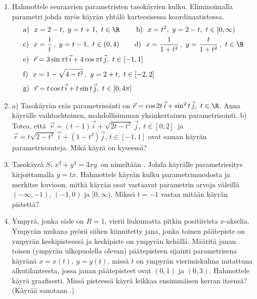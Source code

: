 \Harj
\begin{enumerate}

\item
Hahmottele seuraavien parametristen tasokäyrien kulku. Eliminoimalla parametri johda myös
käyrän yhtälö karteesisessa koordinaatistossa.
\begin{align*}
&\text{a)}\ \ x=2-t,\ y=t+1,\ t\in\R \qquad\ \text{b)}\ \ x=t^2,\ y=2-t,\ t\in[0,\infty) \\
&\text{c)}\ \ x=\frac{1}{t}\,,\ y=t-1,\ t\in(0,4) \qquad\,
 \text{d)}\ \ x=\frac{1}{1+t^2}\,,\ y=\frac{t}{1+t^2}\,,\ t\in\R \\
&\text{e)}\ \ \vec r=3\sin\pi t\,\vec i+4\cos\pi t\,\vec j,\ t\in[-1,1] \\[1mm]
&\text{f)}\ \ x=1-\sqrt{4-t^2}\,,\ y=2+t,\ t\in[-2,2] \\[1mm] 
&\text{g)}\ \ \vec r=t\cos t\,\vec i+t\sin t\,\vec j,\ t\in[0,4\pi]
\end{align*}

\item
a) Tasokäyrän eräs parametrisointi on $\vec r=\cos 2t\,\vec i+\sin^2 t\,\vec j,\ t\in\R$. 
Anna käyrälle vaihtoehtoinen, mahdollisimman yksinkertainen parametrisointi.
\vspace{1mm}\newline
b) Totea, että $\,\vec r=(t-1)\vec i+\sqrt{2t-t^2}\,\vec j,\ t\in[0,2]\,$ ja 
$\,\vec r=t\sqrt{2-t^2}\,\vec i+(1-t^2)\vec j$, \newline $t\in[-1,1]$ ovat saman käyrän 
parametrisointeja. Mikä käyrä on kyseessä?

\item {}
Tasokäyrä $S:\,x^3+y^3=3xy\,$ on nimeltään . Johda käyrälle
parametriesitys kirjoittamalla $y=tx$. Hahmottele käyrän kulku parametrimuodosta ja merkitse
kuvioon, mitkä käyrän osat vastaavat parametrin arvoja väleillä $(-\infty,-1)$, $(-1,0)$ ja 
$[0,\infty)$. Miksei $t=-1$ vastaa mitään käyrän pistettä?

\item {}
Ympyrä, jonka säde on $R=1$, vierii liukumatta pitkin positiivista $x$-akselia. Ympyrän mukana
pyörii siihen kiinnitetty jana, jonka toinen päätepiste on ympyrän keskipisteessä ja keskipiste
on ympyrän kehällä. Määritä janan toisen (ympyrän ulkopuolella olevan) päätepisteen sijainti
parametrisena käyränä $x=x(t),\ y=y(t)$, missä $t$ on ympyrän vierimiskulma mitattuna 
alkutilanteesta, jossa janan päätepisteet ovat $(0,1)$ ja $(0,3)$. Hahmottele käyrä
graafisesti. Missä pisteessä käyrä leikkaa ensimmäisen kerran itsensä? (Käyrää sanotaan 
.)


\end{enumerate}
